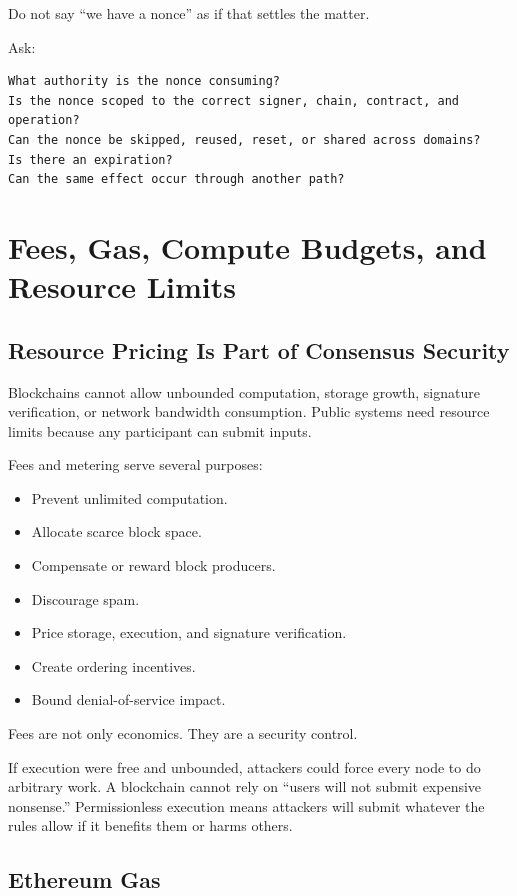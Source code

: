 Do not say ``we have a nonce'' as if that settles the matter.

Ask:

\begin{lstlisting}
What authority is the nonce consuming?
Is the nonce scoped to the correct signer, chain, contract, and operation?
Can the nonce be skipped, reused, reset, or shared across domains?
Is there an expiration?
Can the same effect occur through another path?
\end{lstlisting}

\section{Fees, Gas, Compute Budgets, and Resource Limits}

\subsection{Resource Pricing Is Part of Consensus Security}

Blockchains cannot allow unbounded computation, storage growth,
signature verification, or network bandwidth consumption. Public systems
need resource limits because any participant can submit inputs.

Fees and metering serve several purposes:

\begin{itemize}
\tightlist
\item
  Prevent unlimited computation.
\item
  Allocate scarce block space.
\item
  Compensate or reward block producers.
\item
  Discourage spam.
\item
  Price storage, execution, and signature verification.
\item
  Create ordering incentives.
\item
  Bound denial-of-service impact.
\end{itemize}

Fees are not only economics. They are a security control.

If execution were free and unbounded, attackers could force every node
to do arbitrary work. A blockchain cannot rely on ``users will not
submit expensive nonsense.'' Permissionless execution means attackers
will submit whatever the rules allow if it benefits them or harms
others.

\subsection{Ethereum Gas}

